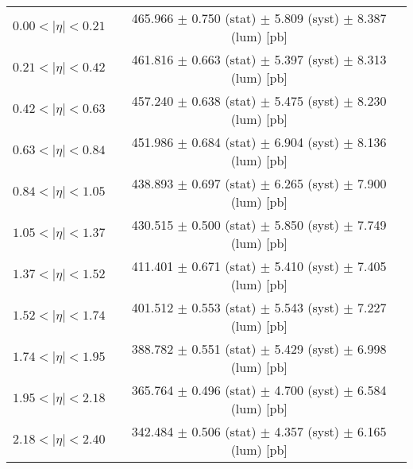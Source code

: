 \begin{tabular}{lc}
\hline
$0.00 < |\eta| <0.21$          & 465.966 $\pm$ 0.750 (stat) $\pm$ 5.809 (syst) $\pm$ 8.387 (lum) [pb]  \\
$0.21 < |\eta| <0.42$          & 461.816 $\pm$ 0.663 (stat) $\pm$ 5.397 (syst) $\pm$ 8.313 (lum) [pb]  \\
$0.42 < |\eta| <0.63$          & 457.240 $\pm$ 0.638 (stat) $\pm$ 5.475 (syst) $\pm$ 8.230 (lum) [pb]  \\
$0.63 < |\eta| <0.84$          & 451.986 $\pm$ 0.684 (stat) $\pm$ 6.904 (syst) $\pm$ 8.136 (lum) [pb]  \\
$0.84 < |\eta| <1.05$          & 438.893 $\pm$ 0.697 (stat) $\pm$ 6.265 (syst) $\pm$ 7.900 (lum) [pb]  \\
$1.05 < |\eta| <1.37$          & 430.515 $\pm$ 0.500 (stat) $\pm$ 5.850 (syst) $\pm$ 7.749 (lum) [pb]  \\
$1.37 < |\eta| <1.52$          & 411.401 $\pm$ 0.671 (stat) $\pm$ 5.410 (syst) $\pm$ 7.405 (lum) [pb]  \\
$1.52 < |\eta| <1.74$          & 401.512 $\pm$ 0.553 (stat) $\pm$ 5.543 (syst) $\pm$ 7.227 (lum) [pb]  \\
$1.74 < |\eta| <1.95$          & 388.782 $\pm$ 0.551 (stat) $\pm$ 5.429 (syst) $\pm$ 6.998 (lum) [pb]  \\
$1.95 < |\eta| <2.18$          & 365.764 $\pm$ 0.496 (stat) $\pm$ 4.700 (syst) $\pm$ 6.584 (lum) [pb]  \\
$2.18 < |\eta| <2.40$          & 342.484 $\pm$ 0.506 (stat) $\pm$ 4.357 (syst) $\pm$ 6.165 (lum) [pb]  \\
\hline
\end{tabular}

